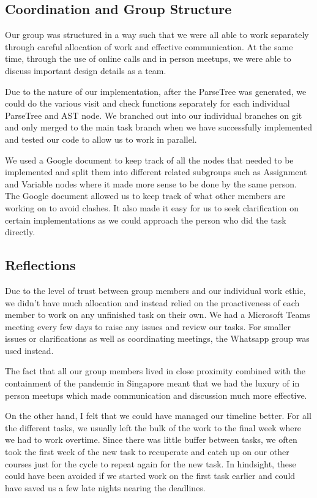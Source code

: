 \documentclass[11pt,a4paper]{article}
\begin{document}
\subsection{Coordination and Group Structure}
Our group was structured in a way such that we were all able to work separately through careful allocation of work and effective communication. At the same time, through the use of online calls and in person meetups, we were able to discuss important design details as a team. 

Due to the nature of our implementation, after the ParseTree was generated, we could do the various visit and check functions separately for each individual ParseTree and AST node. We branched out into our individual branches on git and only merged to the main task branch when we have successfully implemented and tested our code to allow us to work in parallel. 

We used a Google document to keep track of all the nodes that needed to be implemented and split them into different related subgroups such as Assignment and Variable nodes where it made more sense to be done by the same person. The Google document allowed us to keep track of what other members are working on to avoid clashes. It also made it easy for us to seek clarification on certain implementations as we could approach the person who did the task directly.

\subsection{Reflections}
Due to the level of trust between group members and our individual work ethic, we didn't have much allocation and instead relied on the proactiveness of each member to work on any unfinished task on their own. We had a Microsoft Teams meeting every few days to raise any issues and review our tasks. For smaller issues or clarifications as well as coordinating meetings, the Whatsapp group was used instead.     

The fact that all our group members lived in close proximity combined with the containment of the pandemic in Singapore meant that we had the luxury of in person meetups which made communication and discussion much more effective. 

On the other hand, I felt that we could have managed our timeline better. For all the different tasks, we usually left the bulk of the work to the final week where we had to work overtime. Since there was little buffer between tasks, we often took the first week of the new task to recuperate and catch up on our other courses just for the cycle to repeat again for the new task. In hindsight, these could have been avoided if we started work on the first task earlier and could have saved us a few late nights nearing the deadlines.
\end{document}
